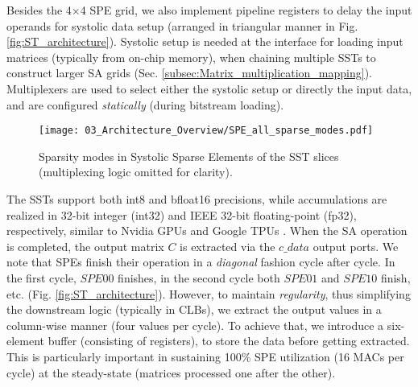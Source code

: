Besides the 4$\times$4 SPE grid, we also implement pipeline registers to delay the input operands for systolic data setup \cite{TPUv1_2017} (arranged in triangular manner in Fig. \ref{fig:ST_architecture}).
Systolic setup is needed at the interface for loading input matrices (typically from on-chip memory), when chaining multiple SSTs to construct larger SA grids (Sec. \ref{subsec:Matrix_multiplication_mapping}).
Multiplexers are used to select either the systolic setup
or directly the input data, and are configured \textit{statically} (during bitstream loading). 




\begin{figure*}[tbp]
\vspace{-0.40cm}
\centering
\texttt{[image: 03\_Architecture\_Overview/SPE\_all\_sparse\_modes.pdf]}

\vspace{-0.45cm}

\caption{Sparsity modes in Systolic Sparse Elements of the SST slices (multiplexing logic omitted for clarity).}
\label{fig:SPE_sparse_modes}
\vspace{-0.35cm}
\end{figure*}


The SSTs support both int8 and bfloat16 precisions, while accumulations are realized in 32-bit integer (int32) and IEEE 32-bit floating-point (fp32), respectively, similar to Nvidia GPUs \cite{Nvidia_accelerate_sparse_2021} and Google TPUs \cite{TPUV2_v3_2021}.
When the SA operation is completed, the output matrix $C$ is extracted via the $c\_data$ output ports.
We note that SPEs finish their operation in a \textit{diagonal} fashion cycle after cycle.
In the first cycle, $SPE00$ finishes, in the second cycle both $SPE01$ and $SPE10$ finish, etc. (Fig. \ref{fig:ST_architecture}). 
However, to maintain \textit{regularity}, thus simplifying the downstream logic (typically in CLBs), we extract the output values in a column-wise manner (four values per cycle).
To achieve that, we introduce a six-element buffer (consisting of registers), to store the data before getting extracted.
This is particularly important in sustaining 100\% SPE utilization (16 MACs per cycle) at the steady-state (matrices processed one after the other).

